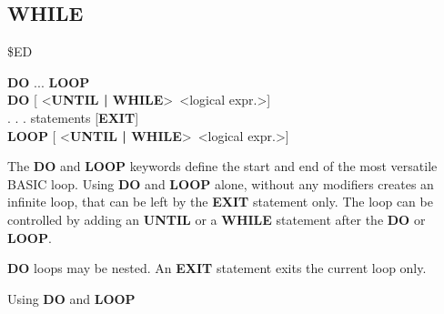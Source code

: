 \subsection{WHILE}
\begin{description}[leftmargin=3cm,style=nextline]
\item [Token:] \$ED
\item [Format:] {\bf DO} ... {\bf LOOP} \\
                {\bf DO} [ <{\bf UNTIL | WHILE}> <logical expr.>] \\
                . . . statements [{\bf EXIT}] \\
                {\bf LOOP} [ <{\bf UNTIL | WHILE}> <logical expr.>]
\item [Usage:] The {\bf DO} and {\bf LOOP} keywords define
               the start and end of the most versatile BASIC loop.
               Using {\bf DO} and {\bf LOOP} alone, without any
               modifiers creates an infinite loop, that can be left
               by the {\bf EXIT} statement only. The loop can be
               controlled by adding an {\bf UNTIL} or a {\bf WHILE}
               statement after the {\bf DO} or {\bf LOOP}.

\item [Remarks:] {\bf DO} loops may be nested. An {\bf EXIT} statement
               exits the current loop only.
\item [Example:] Using {\bf DO} and {\bf LOOP}
\end{description}


\newpage
